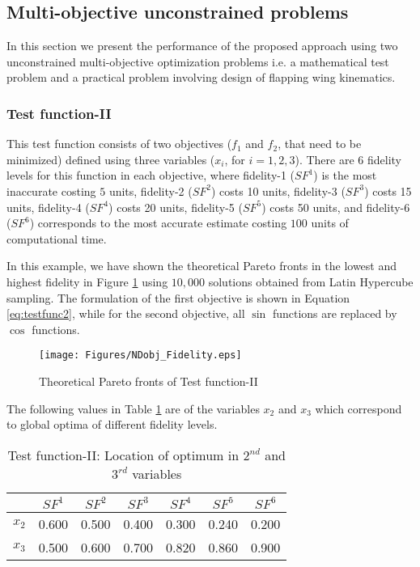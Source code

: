 \subsection{Multi-objective unconstrained problems}
In this section we present the performance of the proposed approach using two unconstrained multi-objective optimization problems i.e. a mathematical test problem and a practical problem involving design of flapping wing kinematics. 
\subsubsection{Test function-II}

This test function consists of two objectives ($f_1$ and $f_2$, that need to be minimized) defined using three variables ($x_i$, for $i = 1,2,3$). There are $6$ fidelity levels for this function in each objective, where fidelity-1 ($SF^1$) is the most inaccurate costing $5$ units, fidelity-2 ($SF^2$) costs 10 units, fidelity-3 ($SF^3$) costs 15 units, fidelity-4 ($SF^4$) costs 20 units, fidelity-5 ($SF^5$) costs 50 units, and fidelity-6 ($SF^6$) corresponds to the most accurate estimate costing $100$ units of computational time. 

In this example, we have shown the theoretical Pareto fronts in the lowest and highest fidelity in Figure \ref{fig:fspaceparetoalltestfunc2} using $10,000$ solutions obtained from Latin Hypercube sampling. The formulation of the first objective is shown in Equation \ref{eq:testfunc2}, while for the second objective, all $\sin$ functions are replaced by $\cos$ functions. 

\begin{figure}[ht]
	\centering
	\texttt{[image: Figures/NDobj\_Fidelity.eps]}
	\caption{Theoretical Pareto fronts of Test function-II}
	\label{fig:fspaceparetoalltestfunc2}
\end{figure}

The following values in Table \ref{tab:testfunc2loc} are of the variables $x_2$ and $x_3$ which correspond to global optima of different fidelity levels.

\begin{table}[!htb]\footnotesize
	\caption{Test function-II: Location of optimum in $2^{nd}$ and $3^{rd}$ variables}
	\label{tab:testfunc2loc}
	\centering
	\begin{tabular}{|c|c|c|c|c|c|c|}
		\noalign{\smallskip}\hline
		&$SF^1$&$SF^2$&$SF^3$&$SF^4$&$SF^5$&$SF^6$\\ \hline
		$x_2$&0.600&0.500&0.400&0.300&0.240&0.200\\ \hline
		$x_3$&0.500&0.600&0.700&0.820&0.860&0.900\\ \hline
	\end{tabular}
\end{table}

